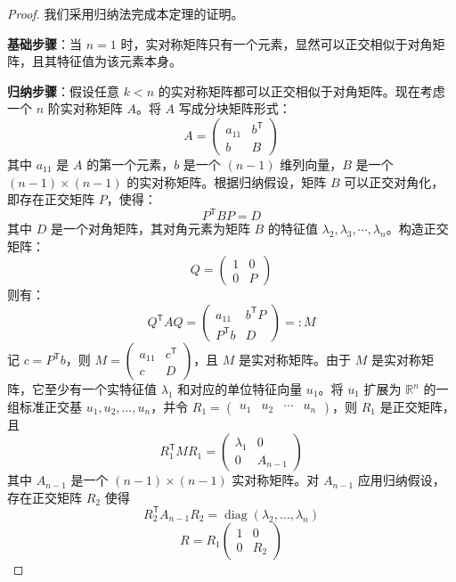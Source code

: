 \documentclass[a4paper,12pt]{ctexart}
\begin{document}
\begin{proof}
    我们采用归纳法完成本定理的证明。
    
    \textbf{基础步骤}：当 $n = 1$ 时，实对称矩阵只有一个元素，显然可以正交相似于对角矩阵，且其特征值为该元素本身。
    
    \textbf{归纳步骤}：假设任意 $k < n$ 的实对称矩阵都可以正交相似于对角矩阵。现在考虑一个 $n$ 阶实对称矩阵 $A$。将 $A$ 写成分块矩阵形式：
    \[
    A = \begin{pmatrix}
    a_{11} & b^{\mathsf{T}} \\
    b & B
    \end{pmatrix}
    \]
    其中 $a_{11}$ 是 $A$ 的第一个元素，$b$ 是一个 $(n-1)$ 维列向量，$B$ 是一个 $(n-1) \times (n-1)$ 的实对称矩阵。根据归纳假设，矩阵 $B$ 可以正交对角化，即存在正交矩阵 $P$，使得：
    \[
    P^{\mathsf{T}} B P = D
    \]
    其中 $D$ 是一个对角矩阵，其对角元素为矩阵 $B$ 的特征值 $\lambda_2, \lambda_3, \cdots, \lambda_n$。构造正交矩阵：
    \[
    Q = \begin{pmatrix}
    1 & 0 \\
    0 & P
    \end{pmatrix}
    \]
    则有：
    \[
    Q^{\mathsf{T}} A Q = \begin{pmatrix}
    a_{11} & b^{\mathsf{T}} P \\
    P^{\mathsf{T}} b & D
    \end{pmatrix} =: M
    \]
    记 $c = P^{\mathsf{T}} b$，则 $M = \begin{pmatrix} a_{11} & c^{\mathsf{T}} \\ c & D \end{pmatrix}$，且 $M$ 是实对称矩阵。由于 $M$ 是实对称矩阵，它至少有一个实特征值 $\lambda_1$ 和对应的单位特征向量 $u_1$。将 $u_1$ 扩展为 $\mathbb{R}^n$ 的一组标准正交基 $u_1, u_2, \ldots, u_n$，并令 $R_1 = \begin{pmatrix} u_1 & u_2 & \cdots & u_n \end{pmatrix}$，则 $R_1$ 是正交矩阵，且
    \[
    R_1^{\mathsf{T}} M R_1 = \begin{pmatrix}
    \lambda_1 & 0 \\
    0 & A_{n-1}
    \end{pmatrix}
    \]
    其中 $A_{n-1}$ 是一个 $(n-1) \times (n-1)$ 实对称矩阵。对 $A_{n-1}$ 应用归纳假设，存在正交矩阵 $R_2$ 使得
    \[
    R_2^{\mathsf{T}} A_{n-1} R_2 = \operatorname{diag}(\lambda_2, \ldots, \lambda_n)
    \]
    \[
    R = R_1 \begin{pmatrix} 1 & 0 \\ 0 & R_2 \end{pmatrix}
\]
\end{proof}
\end{document}
